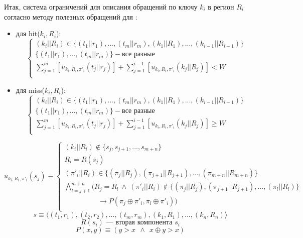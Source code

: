 Итак, система ограничений для описания обращений по ключу $k_i$ в регион $R_i$ согласно методу полезных обращений для \PseudoLRU:
\begin{itemize}
\item для hit($k_i, R_i$):
$$
\left\{\begin{array}{l}
(k_i||R_i) \in \{(t_1||r_1), ..., (t_m||r_m), (k_1||R_1), ..., (k_{i-1}||R_{i-1})\}\\
\{(t_1||r_1), ..., (t_m||r_m)\} - \mbox{все разные}\\
\sum\limits_{j=1}^m [u_{k_i,R_i,\pi'_i}(t_j||r_j)] + \sum\limits_{j=1}^{i-1} [u_{k_i,R_i,\pi'_i}(k_j||R_j)] < W\\
\end{array} \right.
$$
\item для miss($k_i, R_i$):
$$
\left\{\begin{array}{l}
(k_i||R_i) \in \{(t_1||r_1), ..., (t_m||r_m), (k_1||R_1), ..., (k_{i-1}||R_{i-1})\}\\
\{(t_1||r_1), ..., (t_m||r_m)\} - \mbox{все разные}\\
\sum\limits_{j=1}^m [u_{k_i,R_i,\pi'_i}(t_j||r_j)] + \sum\limits_{j=1}^{i-1} [u_{k_i,R_i,\pi'_i}(k_j||R_j)] \geqslant W\\
\end{array} \right.
$$
\end{itemize}

$$u_{k_i,R_i,\pi'_i} (s_j)  \equiv \left\{\begin{array}{l}
(k_i||R_i) \notin \{s_j, s_{j+1}, ..., s_{m+n}\}\\
R_i = R(s_j)\\
(\pi'_i||R_i) \in \{(\pi_j||R_j), (\pi_{j+1} || R_{j+1}), ..., (\pi_{m+n}||R_{m+n})\}\\
\bigwedge\limits_{l = j+1}^{m+n} (R_j = R_l ~\wedge~(\pi'_i||R_i) \notin \{(\pi_j||R_j), (\pi_{j+1}||R_{j+1}), ..., (\pi_l||R_l)\}\\
 \hspace{2cm} \rightarrow P(\pi_j \oplus \pi'_i, \pi_l \oplus \pi'_i))\\
\end{array}\right.
$$
$$s \equiv \langle (t_1,r_1), (t_2,r_2), ..., (t_m,r_m), (k_1, R_1), ..., (k_n,R_n) \rangle$$
$$R(s_i) \mbox{~--- вторая компонента~} s_i$$
$$P(x, y) \equiv (y > x~~\wedge~~x \oplus y > x)$$



